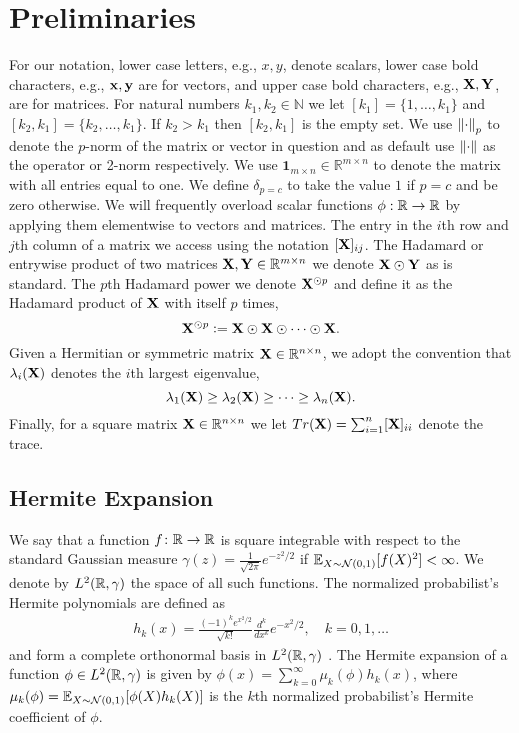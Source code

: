 \section{Preliminaries} \label{subsec:preliminaries}
For our notation, lower case letters, e.g., $x,y$, denote scalars, lower case bold characters, e.g., $\mathbf x, \mathbf y$ are for vectors, and upper case bold characters, e.g., $\mathbf{X}, \mathbf{Y}$, are for matrices.  For natural numbers $k_1, k_2 \in \mathbb{N}$ we let $[k_1] = \{1, \ldots, k_1\}$ and $[k_2, k_1] = \{k_2, \ldots, k_1\}$. If $k_2>k_1$ then $[k_2,k_1]$ is the empty set. We use $\left\lVert\cdot\right\rVert_p$ to denote the $p$-norm of the matrix or vector in question and as default use $\left\lVert\cdot\right\rVert$ as the operator or 2-norm respectively. We use $\mathbf{1}_{m \times n} \in \mathbb{R}^{m \times n}$ to denote the matrix with all entries equal to one. We define $\delta_{p=c}$ to take the value $1$ if $p=c$ and be zero otherwise. We will frequently overload scalar functions $\phi:\mathbb{R} \rightarrow \mathbb{R}$ by applying them elementwise to vectors and matrices. The entry in the $i$th row and $j$th column of a matrix we access using the notation $[\mathbf{X}]_{ij}$. The Hadamard or entrywise product of two matrices $\mathbf{X}, \mathbf{Y} \in \mathbb{R}^{m \times n}$ we denote $\mathbf{X} \odot \mathbf{Y}$ as is standard. The $p$th Hadamard power we denote $\mathbf{X}^{\odot p}$ and define it as the Hadamard product of $\mathbf{X}$ with itself $p$ times, 
\[
\mathbf{X}^{\odot p} \vcentcolon= \mathbf{X} \odot \mathbf{X} \odot \cdots \odot \mathbf{X}.
\]
Given a Hermitian or symmetric matrix $\mathbf{X} \in \mathbb{R}^{n \times n}$, we adopt the convention that $\lambda_i(\mathbf{X})$ denotes the $i$th largest eigenvalue,
\[
\lambda_1(\mathbf{X}) \geq \lambda_2(\mathbf{X}) \geq \cdots \geq \lambda_n(\mathbf{X}).
\]
Finally, for a square matrix $\mathbf{X} \in \mathbb{R}^{n \times n}$ we let $Tr(\mathbf{X}) = \sum_{i = 1}^n [\mathbf{X}]_{ii}$ denote the trace.

\subsection{Hermite Expansion}
We say that a function $f\colon \mathbb{R} \rightarrow \mathbb{R}$ is square integrable with respect to the standard Gaussian measure $\gamma(z) = \frac{1}{\sqrt{2 \pi}} e^{-z^2/2}$ if $\mathbb{E}_{X \sim \mathcal{N}(0,1)}[f(X)^2]< \infty$. 
We denote by $L^2(\mathbb{R},\gamma)$ the space of all such functions. The normalized probabilist's Hermite polynomials are defined as
\begin{align*}
	h_k(x)=\frac{{(-1)}^ke^{x^2/2}}{\sqrt{k!}} \frac{d^{k}}{d x^{k}} e^{-x^2/2}, \quad k=0,1,\ldots 
\end{align*}
and form a complete orthonormal basis in $L^2(\mathbb{R},\gamma)$ \cite[\S 11]{donnellbook}. The Hermite expansion of a function $\phi \in L^2(\mathbb{R} ,\gamma)$ is given by $\phi(x)= \sum_{k=0}^\infty \mu_k(\phi) h_k(x)$, where $\mu_k(\phi) = \mathbb{E}_{X \sim \mathcal{N}(0,1)}[\phi(X)h_k(X)]$ is the $k$th normalized probabilist's Hermite coefficient of $\phi$. 

